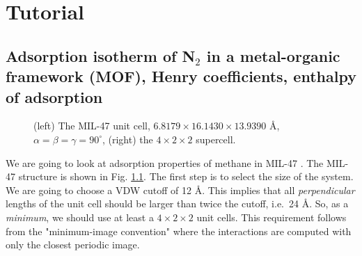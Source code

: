 \chapter{Tutorial}

\section{Adsorption isotherm of N$_2$ in a metal-organic framework (MOF), Henry coefficients, enthalpy of adsorption}


\begin{figure}[H]
  \centering
  \caption{(left) The MIL-47 unit cell, $6.8179\times 16.1430 \times 13.9390$ \AA, $\alpha=\beta=\gamma=90^\circ$, (right) the $4\times2\times2$ supercell.}
  \label{Tutorial-MIL-47.jpg}
\end{figure}

We are going to look at adsorption properties of methane in MIL-47 \cite{Barthelet2002}. The MIL-47 structure is shown in Fig. \ref{Tutorial-MIL-47.jpg}.
The first step is to select the size of the system. We are going to choose a VDW cutoff of 12 \AA. This implies that all \emph{perpendicular} lengths
of the unit cell should be larger than twice the cutoff, i.e.\ 24 \AA. So, as a \emph{minimum}, we should use at least a $4\times2\times2$ unit cells.
This requirement follows from the "minimum-image convention" where the interactions are computed with only the closest periodic image.

